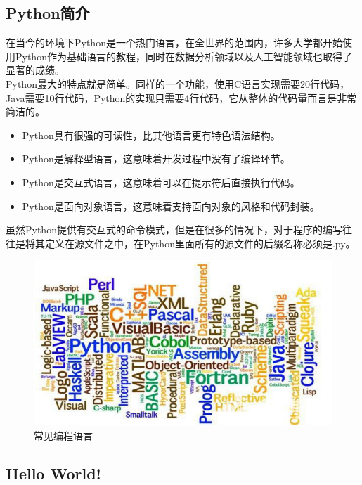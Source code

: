 \subsection{Python简介}

在当今的环境下Python是一个热门语言，在全世界的范围内，许多大学都开始使用Python作为基础语言的教程，同时在数据分析领域以及人工智能领域也取得了显著的成绩。\\

Python最大的特点就是简单。同样的一个功能，使用C语言实现需要20行代码，Java需要10行代码，Python的实现只需要4行代码，它从整体的代码量而言是非常简洁的。

\begin{itemize}
	\item Python具有很强的可读性，比其他语言更有特色语法结构。
	\item Python是解释型语言，这意味着开发过程中没有了编译环节。
	\item Python是交互式语言，这意味着可以在提示符后直接执行代码。
	\item Python是面向对象语言，这意味着支持面向对象的风格和代码封装。
\end{itemize}

虽然Python提供有交互式的命令模式，但是在很多的情况下，对于程序的编写往往是将其定义在源文件之中，在Python里面所有的源文件的后缀名称必须是.py。

\begin{figure}[H]
	\centering
	\includegraphics[scale=0.9]{img/C1/1-1/1.png}
	\caption{常见编程语言}
\end{figure}

\vspace{0.5cm}

\subsection{Hello World!}

